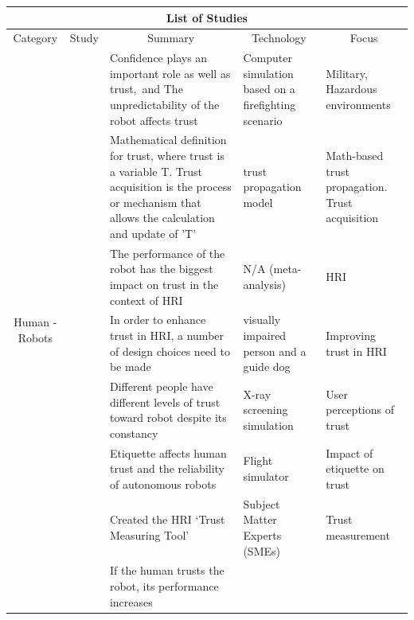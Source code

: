 \documentclass[runningheads,a4paper]{llncs}
\begin{document}
\begin{center}
\setlength\LTleft{0pt}
\setlength\LTright{0pt}
\begin{longtable}{|c|c|p{4cm}|p{2cm}|p{2cm}|}
\hline
\multicolumn{5}{|c|}{List of Studies}                                                                                               \\ \hline
Category                        & Study & \multicolumn{1}{c|}{Summary}    & \multicolumn{1}{c|}{Technology} & \multicolumn{1}{c|}{Focus} \\ \hline
\multirow{8}{*}{Human - Robots} 
	& \cite{stormont2008analyzing}    
	&  Confidence plays an important role as well as trust,\ and The unpredictability of the robot affects trust  
	& Computer simulation based on a firefighting scenario                        
	& Military, Hazardous environments
	\\ \cline{2-5} 
	& \cite{esfandiari2001agents}     
	& Mathematical definition for trust, where trust is a variable T. Trust acquisition is the process or mechanism that allows the calculation and update of 'T'
	& trust propagation model                      
	& Math-based trust propagation. Trust acquisition
	\\ \cline{2-5} 
	& \cite{hancock2011meta}
	& The performance of the robot has the biggest impact on trust in the context of HRI
	& N/A (meta-analysis)
	& HRI
	\\ \cline{2-5}
	&  \cite{penders2013enhancing}
	& In order to enhance trust in HRI, a number of design choices need to be made
	& visually impaired person and a guide dog
	& Improving trust in HRI
	\\ \cline{2-5} 
	& \cite{merritt2008not}
	& Different people have different levels of trust toward robot despite its constancy
	& X-ray screening simulation             
	& User perceptions of trust
	\\ \cline{2-5} 
	& \cite{parasuraman2004trust}
	& Etiquette affects human trust and the reliability of autonomous robots
	& Flight simulator
	& Impact of etiquette on trust
	\\ \cline{2-5} 
	& \cite{yagoda2012you}
	& Created the HRI `Trust Measuring Tool'
	& Subject Matter Experts (SMEs)                
	& Trust measurement
	\\ \cline{2-5} 
	& \cite{wang2014human}
	& If the human trusts the robot, its performance increases

\end{longtable}
\end{center}
\end{document}
